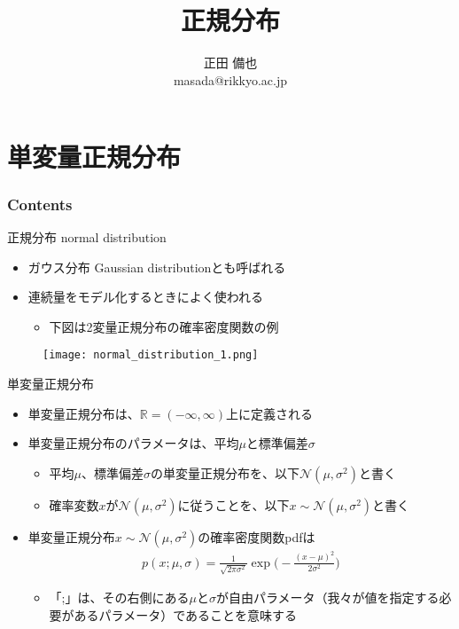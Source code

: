 \documentclass[aspectratio=169,unicode,dvipdfmx,14pt]{beamer}
\title{\ \\正規分布}
\author{正田 備也\\{\small masada@rikkyo.ac.jp}}
\date{}
\begin{document}
\begin{frame}
\titlepage
\end{frame}

\section{単変量正規分布}

\begin{frame}\frametitle{Contents}
\Large \tableofcontents[currentsection]
\end{frame}

\begin{frame}{正規分布 normal distribution}
\begin{itemize}
\item ガウス分布 Gaussian distributionとも呼ばれる
\item 連続量をモデル化するときによく使われる
\begin{itemize}
\item 下図は2変量正規分布の確率密度関数の例
\end{itemize}
\end{itemize}
\begin{figure}
\center
\texttt{[image: normal\_distribution\_1.png]}
\end{figure}
\end{frame}

\begin{frame}{単変量正規分布}
\begin{itemize}
\item 単変量正規分布は、$\mathbb{R}=(-\infty,\infty)$上に定義される
\item 単変量正規分布のパラメータは、平均$\mu$と標準偏差$\sigma$
\begin{itemize}
\item 平均$\mu$、標準偏差$\sigma$の単変量正規分布を、以下$\mathcal{N}(\mu,\sigma^2)$と書く
\item 確率変数$x$が$\mathcal{N}(\mu,\sigma^2)$に従うことを、以下$x\sim\mathcal{N}(\mu,\sigma^2)$と書く
\end{itemize}
\item 単変量正規分布$x\sim\mathcal{N}(\mu,\sigma^2)$の確率密度関数pdfは
\begin{align}
p(x;\mu,\sigma) = \frac{1}{\sqrt{2\pi\sigma^2}}\exp\Big( - \frac{(x - \mu)^2}{2\sigma^2} \Big)
\end{align}
\begin{itemize}
\item 「;」は、その右側にある$\mu$と$\sigma$が自由パラメータ（我々が値を指定する必要があるパラメータ）であることを意味する
\end{itemize}
\end{itemize}
\end{frame}
\end{document}
